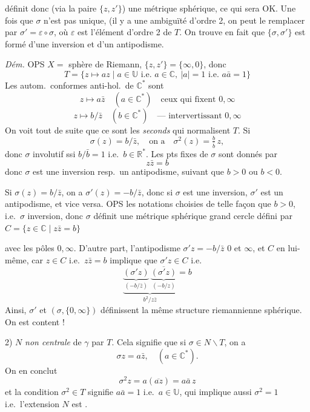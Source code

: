 \documentclass[11pt,a4paper]{article}
\begin{document}

définit donc (via la paire $\{z, z'\}$) une métrique sphérique, ce qui sera
OK. Une fois   que $\sigma$ n'est pas
unique, (il y a une ambiguïté d'ordre 2, on peut le remplacer par
$\sigma' = \varepsilon \circ \sigma$, où $\varepsilon$ est l'élément d'ordre
2 de $T$. On trouve en fait que $\{\sigma, \sigma'\}$ est formé d'une
inversion et d'un antipodisme.

\emph{Dém.} OPS $X =$ sphère de Riemann, $\{z, z'\} = \{\infty, 0\}$, donc
\[
  T = \{ z \mapsto az \mid a \in \mathbb{U} \text{ i.e. } a \in \mathbb{C},\
  |a| = 1 \text{ i.e. } a\bar{a} = 1 \}
\]
Les \struck{\ill{}} autom.\ conformes anti-hol.\ de $\mathbb{C}^{*}$ sont
\[
  z \longmapsto a\bar{z} \quad (a \in \mathbb{C}^{*}) \quad
  \text{ceux qui fixent } 0, \infty
\]
\[
  z \longmapsto b/\bar{z} \quad (b \in \mathbb{C}^{*}) \quad
  \text{— intervertissant } 0, \infty
\]
On voit tout de suite que ce sont les \emph{seconds} qui normalisent $T$.
\struck{Un tel} Si
\[
  \sigma(z) = b/\bar{z} , \quad \text{on a} \quad
  \sigma^{2}(z) = \tfrac{b}{\bar{b}}\, z ,
\]
donc $\sigma$ involutif ssi $b/\bar{b} = 1$ i.e.\ $b \in \mathbb{R}^{*}$.
Les pts fixes de $\sigma$ sont donnés par
\[
  z\bar{z} = b
\]
\struck{\ill{}} donc $\sigma$ est une inversion resp.\ un antipodisme,
suivant que \struck{$b \in \mathbb{R}$} $b > 0$ ou $b < 0$.

Si $\sigma(z) = b/\bar{z}$, on a $\sigma'(z) = -b/\bar{z}$, donc si
\struck{\ill{}} $\sigma$ est une inversion, $\sigma'$ est un antipodisme, et
vice versa. OPS les notations choisies de telle façon que $b > 0$, i.e.\
$\sigma$ inversion, donc $\sigma$ définit une métrique sphérique
\uncertain{dont} \uncertain{un} grand cercle \uncertain{est} défini par
$C = \{z \in \mathbb{C} \mid z\bar{z} = b\}$


\struck{\ill{}} avec les pôles $0, \infty$. D'autre part, l'antipodisme
$\sigma' z = -b/\bar{z}$   $0$ et
$\infty$, et \struck{transforme $z \in C$} $C$ en lui-même, car
$z \in C$ i.e.\ $z\bar{z} = b$ implique que $\sigma' z \in C$ i.e.\
\[
  \underbrace{\underbrace{(\sigma' z)}_{(-b/\bar{z})}\,
  \underbrace{\overline{(\sigma' z)}}_{(-b/z)}}_{b^{2}/z\bar{z}} = b
\]
Ainsi, $\sigma'$ et $(\sigma, \{0, \infty\})$ définissent la même
structure riemannienne sphérique. On est content !

2) $N$ \struck{est} \emph{non centrale} de $\gamma$ par $T$. Cela signifie
que si $\sigma \in N \smallsetminus T$, on a
\[
  \sigma z = a\bar{z} , \quad (a \in \mathbb{C}^{*}) .
\]
 On en conclut
\[
  \sigma^{2} z = a(\overline{a z}) = a\bar{a}\, z
\]
et la condition $\sigma^{2} \in T$ signifie $a\bar{a} = 1$ i.e.\
$a \in \mathbb{U}$, qui implique aussi \struck{\ill{}} $\sigma^{2} = 1$ i.e.\
l'extension $N$ est .
\end{document}
